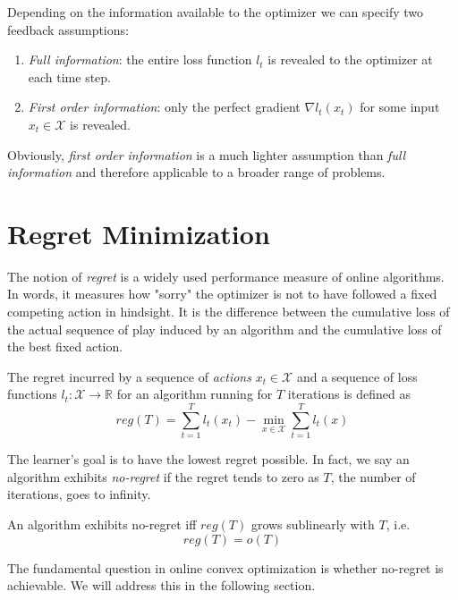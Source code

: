 Depending on the information available to the optimizer we can specify two feedback assumptions:

\begin{enumerate}
    \item \textit{Full information}: the entire loss function $l_t$ is revealed to the optimizer at each time step.
    \item \textit{First order information}: only the perfect gradient $\nabla l_t(x_t)$ for some input $x_t \in \mathcal{X}$ is revealed. 
\end{enumerate}

Obviously, \textit{first order information} is a much lighter assumption than \textit{full information} and therefore applicable to a broader range of problems. 


\section{Regret Minimization}\label{section:regretMinimization}

The notion of \textit{regret} is a widely used performance measure of online algorithms. In words, it measures how "sorry" the optimizer is not to have followed
a fixed competing action in hindsight. It is the difference between the cumulative loss
of the actual sequence of play induced by an algorithm and the cumulative loss of the best fixed action.

\begin{definition}\label{def:regret}
    The regret incurred by a sequence of \textit{actions} $x_t \in \mathcal{X}$ and a sequence of loss functions $l_t:\mathcal{X} \to\mathbb{R}$ for an algorithm running for $T$ iterations is defined as
    \[reg(T) = \sum_{t=1}^T l_t(x_t) - \min_{x \in \mathcal{X}} \sum_{t=1}^T l_t(x)\]
\end{definition}

The learner's goal is to have the lowest regret possible. In fact, we say an algorithm exhibits \textit{no-regret} if the regret tends to zero as $T$, the number of iterations, goes to infinity.

\begin{definition}\label{def:noRegret}
    An algorithm exhibits no-regret iff $reg(T)$ grows sublinearly  with $T$, i.e.
    \[reg(T) = o(T)\]
\end{definition}

The fundamental question in online convex optimization is whether no-regret is achievable. We will address this in the following section. 

